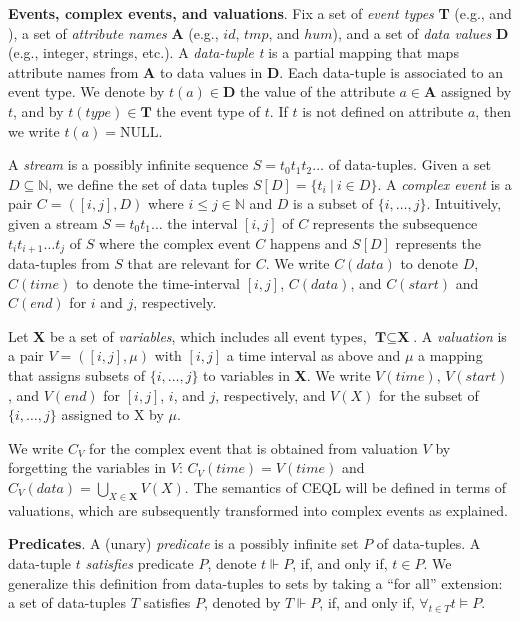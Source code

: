 \textbf{Events, complex events, and valuations}. Fix a set of \emph{event types} \textbf{T} (e.g.,  and ), a set of \emph{attribute names} \textbf{A} (e.g., $id$, $tmp$, and $hum$), and a set of \emph{data values} \textbf{D} (e.g., integer, strings, etc.). A \emph{data-tuple t} is a partial mapping that maps attribute names from \textbf{A} to data values in \textbf{D}. Each data-tuple is associated to an event type. We denote by $t(a) \in \textbf{D}$ the value of the attribute $a \in \textbf{A}$ assigned by $t$, and by $t(type) \in \textbf{T}$ the event type of $t$. If $t$ is not defined on attribute $a$, then we write $t(a) = \text{NULL}$.

A \emph{stream} is a possibly infinite sequence $S = t_{0}t_{1}t_{2}\ldots$ of data-tuples. Given a set $D \subseteq \mathbb{N}$, we define the set of data tuples $S[D] = \{ t_{i} \ | \ i \in D\}$. A \emph{complex event} is a pair $C = ([i,j], D)$ where $i \le j \in \mathbb{N}$ and $D$ is a subset of $\{i, \ldots, j\}$. Intuitively, given a stream $S = t_{0}t_{1}\ldots$ the interval $[i, j]$ of $C$ represents the subsequence $t_{i}t_{i+1} \ldots t_{j}$ of $S$ where the complex event $C$ happens and $S[D]$ represents the data-tuples from $S$ that are relevant for $C$. We write $C(data)$ to denote $D$, $C(time)$ to denote the time-interval $[i, j]$, $C(data)$, and $C(start)$ and $C(end)$ for $i$ and $j$, respectively.

Let \textbf{X} be a set of \emph{variables}, which includes all event types, $\textbf{T} \subseteq \textbf{X}$. A \emph{valuation} is a pair $V = ([i, j], \mu)$ with $[i,j]$ a time interval as above and $\mu$ a mapping that assigns subsets of $\{i, \ldots, j\}$ to variables in \textbf{X}. We write $V(time)$, $V(start)$, and $V(end)$ for $[i,j]$, $i$, and $j$, respectively, and $V(X)$ for the subset of $\{i,\ldots, j\}$ assigned to X by $\mu$.

We write $C_{V}$ for the complex event that is obtained from valuation $V$ by forgetting the variables in $V$: $C_{V}(time) = V(time)$ and $C_{V}(data) = \bigcup\limits_{X \in \textbf{X}} V(X)$. The semantics of CEQL will be defined in terms of valuations, which are subsequently transformed into complex events as explained.

\textbf{Predicates}. A (unary) \emph{predicate} is a possibly infinite set $P$ of data-tuples. A data-tuple $t$ \emph{satisfies} predicate $P$, denote $t \Vdash P$, if, and only if, $t \in P$. We generalize this definition from data-tuples to sets by taking a ``for all'' extension: a set of data-tuples $T$ satisfies $P$, denoted by $T \Vdash P$, if, and only if, $\displaystyle\mathop{\forall}_{t \in T} t \vDash P$.

